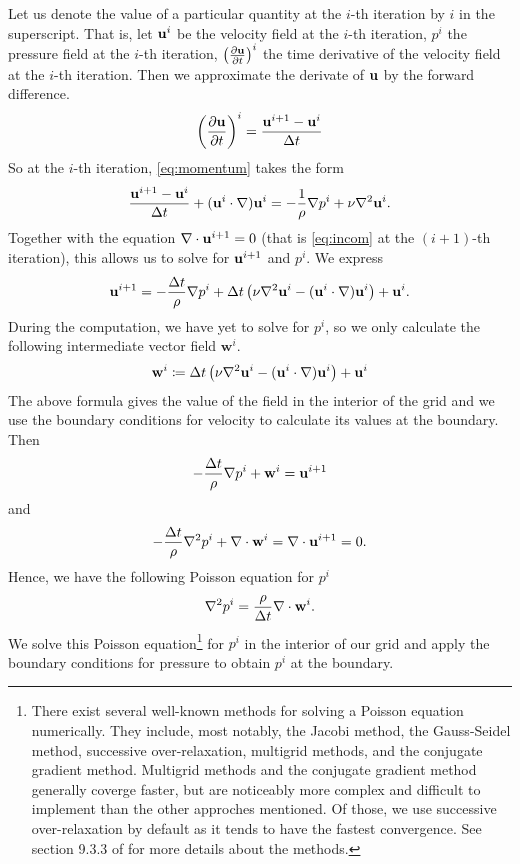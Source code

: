 \documentclass[11pt,a4paper,twoside,openright]{report}
\begin{document}
Let us denote the value of a particular quantity at the $i$-th iteration by $i$ in the superscript. That is, let $\mathbf u^i$ be the velocity field at the $i$-th iteration, $p^i$ the pressure field at the $i$-th iteration, $\left(\frac{\partial \mathbf u}{\partial t}\right)^i$ the time derivative of the velocity field at the $i$-th iteration. Then we approximate the derivate of $\mathbf u$ by the forward difference.
\begin{align*}
	\left(\frac{\partial \mathbf u}{\partial t}\right)^i=\frac{\mathbf u^{i+1}-\mathbf u^i}{\Delta t}
\end{align*}
So at the $i$-th iteration, \eqref{eq:momentum} takes the form
\begin{align*}
	\frac{\mathbf u^{i+1}-\mathbf u^i}{\Delta t}+(\mathbf u^i\cdot\nabla)\mathbf u^i=-\frac1\rho\nabla p^i+\nu\nabla^2\mathbf u^i.
\end{align*}
Together with the equation $\nabla\cdot\mathbf u^{i+1}=0$ (that is \eqref{eq:incom} at the $(i+1)$-th iteration), this allows us to solve for $\mathbf u^{i+1}$ and $p^i$. We express
\begin{align*}
	\mathbf u^{i+1}=-\frac{\Delta t}\rho\nabla p^i+\Delta t\left(\nu\nabla^2\mathbf u^i-(\mathbf u^i\cdot\nabla)\mathbf u^i\right)+\mathbf u^i.
\end{align*}
\newcommand{\ww}{\mathbf w}
During the computation, we have yet to solve for $p^i$, so we only calculate the following intermediate vector field $\ww^i$.
\begin{align*}
	\ww^i\coloneqq\dt\left(\nu\nabla^2\uu^i-(\uu^i\cdot\nabla)\uu^i\right)+\uu^i
\end{align*}
The above formula gives the value of the field in the interior of the grid and we use the boundary conditions for velocity to calculate its values at the boundary. Then
\begin{align*}
	-\frac\dt\rho\nabla p^i+\ww^i=\uu^{i+1}
\end{align*}
and
\begin{align*}
	-\frac\dt\rho\nabla^2p^i+\nabla\cdot\ww^i=\nabla\cdot\uu^{i+1}=0.
\end{align*}
Hence, we have the following Poisson equation for $p^i$
\begin{align*}
	\nabla^2p^i=\frac\rho\dt\nabla\cdot\ww^i.
\end{align*}
We solve this Poisson equation\footnote{There exist several well-known methods for solving a Poisson equation numerically. They include, most notably, the Jacobi method, the Gauss-Seidel method, successive over-relaxation, multigrid methods, and the conjugate gradient method. Multigrid methods and the conjugate gradient method generally coverge faster, but are noticeably more complex and difficult to implement than the other approches mentioned. Of those, we use successive over-relaxation by default as it tends to have the fastest convergence. See section 9.3.3 of \cite{Epperson} for more details about the methods.} for $p^i$ in the interior of our grid and apply the boundary conditions for pressure to obtain $p^i$ at the boundary.
\end{document}
